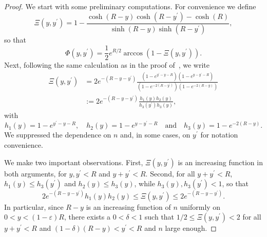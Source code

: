 \begin{proof}
We start with some preliminary computations. For convenience we define
\[
	\Xi(y,y^\prime) = 1 - \frac{\cosh(R- y)\cosh(R-y^\prime) - \cosh(R)}{\sinh(R - y) \sinh(R - y^\prime)},
\]
so that
\[
	\Phi(y, y^\prime) = \frac{1}{2}e^{R/2} \arccos\left(1 - \Xi(y,y^\prime)\right).
\]
Next, following the same calculation as in the proof of~\cite[Lemma 28]{fountoulakis2018law}, we write
\begin{align*}
	\Xi(y,y^\prime)
	&= 2 e^{-(R - y - y^\prime)} \frac{\left(1 - e^{y^\prime - y - R}\right)\left(1 - e^{y - y^\prime - R}\right)}
		{\left(1 - e^{-2(R - y^\prime)}\right)\left(1 - e^{-2(R- y)}\right)}\\
	&:= 2 e^{-(R - y - y^\prime)} \frac{h_1(y) h_2(y)}{h_3(y^\prime) h_3(y)},
\end{align*}
with
\[
	h_1(y) = 1 - e^{y^\prime - y - R}, \quad h_2(y) = 1 - e^{y - y^\prime - R}
	\quad \text{and} \quad h_3(y) = 1 - e^{-2(R- y)}.
\]
We suppressed the dependence on $n$ and, in some cases, on $y^\prime$ for notation convenience.

We make two important observations. First, $\Xi(y,y^\prime)$ is an increasing function in both arguments, for $y, y^\prime < R$ and $y + y^\prime < R$. Second, for all $y + y^\prime < R$, $h_1(y) \le h_3(y^\prime)$ and $h_2(y) \le h_3(y)$, while $h_3(y), h_3(y^\prime) < 1$, so that
\begin{equation}\label{eq:derivative_hyp_ball_Xi_bounds}
	2 e^{-(R - y - y^\prime)}h_1(y) h_2(y) \le \Xi(y,y^\prime) \le 2 e^{-(R - y - y^\prime)}.
\end{equation}
In particular, since $R-y$ is an increasing function of $n$ uniformly on $0 < y < (1-\varepsilon)R$, there exists a $0 < \delta < 1$ such that $1/2 \le \Xi(y,y^\prime) < 2$ for all $y + y^\prime < R$ and $(1-\delta)(R-y) < y^\prime < R$ and $n$ large enough.


\end{proof}
